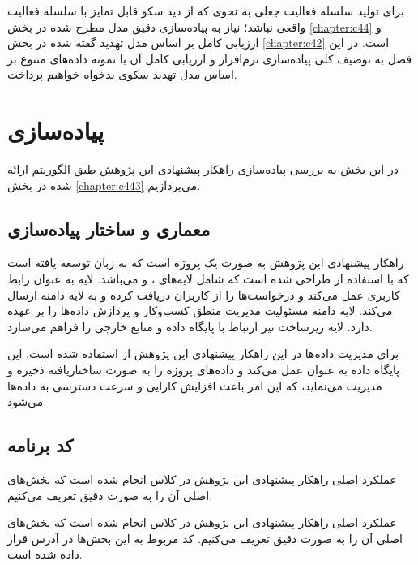 
برای تولید سلسله فعالیت جعلی به نحوی که از دید سکو قابل تمایز با سلسله فعالیت واقعی نباشد؛ نیاز به پیاده‌سازی دقیق مدل مطرح شده در بخش \ref{chapter:c44} و ارزیابی کامل بر اساس مدل تهدید گفته شده در بخش \ref{chapter:c42} است. در این فصل به توصیف کلی پیاده‌سازی نرم‌افزار و ارزیابی کامل آن با نمونه داده‌های متنوع بر اساس مدل تهدید سکوی بدخواه خواهیم پرداخت.

\section{پیاده‌سازی}

در این بخش به بررسی پیاده‌سازی راهکار پیشنهادی این پژوهش طبق الگوریتم ارائه شده در بخش \ref{chapter:c443} می‌پردازیم.

\subsection{معماری و ساختار پیاده‌سازی}

راهکار پیشنهادی این پژوهش به صورت یک پروژه  است که به زبان  توسعه یافته است که با استفاده از  طراحی شده است که شامل لایه‌های ،  و  می‌باشد. لایه  به عنوان رابط کاربری عمل می‌کند و درخواست‌ها را از کاربران دریافت کرده و به لایه دامنه ارسال می‌کند. لایه دامنه مسئولیت مدیریت منطق کسب‌وکار و پردازش داده‌ها را بر عهده دارد. لایه زیرساخت نیز ارتباط با پایگاه داده و منابع خارجی را فراهم می‌سازد.

برای مدیریت داده‌ها در این راهکار پیشنهادی این پژوهش از  استفاده شده است. این پایگاه داده به عنوان  عمل می‌کند و داده‌های پروژه را به صورت ساختاریافته ذخیره و مدیریت می‌نماید، که این امر باعث افزایش کارایی و سرعت دسترسی به داده‌ها می‌شود.

\subsection{کد برنامه}

عملکرد اصلی راهکار پیشنهادی این پژوهش در کلاس  انجام شده است که بخش‌های اصلی آن را به صورت دقیق تعریف می‌کنیم.

عملکرد اصلی راهکار پیشنهادی این پژوهش در کلاس  انجام شده است که بخش‌های اصلی آن را به صورت دقیق تعریف می‌کنیم. کد مربوط به این بخش‌ها در آدرس  قرار داده شده است.



